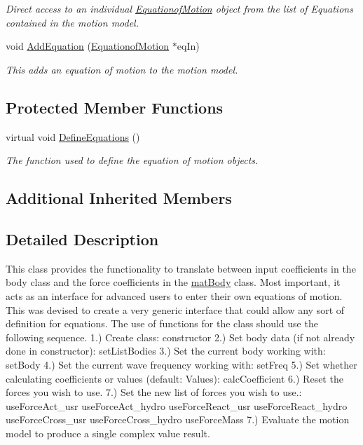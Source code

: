 \begin{DoxyCompactItemize}
\begin{DoxyCompactList}\small\item\em Direct access to an individual \hyperlink{classosea_1_1ofreq_1_1_equationof_motion}{Equationof\-Motion} object from the list of Equations contained in the motion model. \end{DoxyCompactList}\item 
void \hyperlink{classosea_1_1ofreq_1_1_motion_model_a73489d88c07b26109bbb9bdd0a576b30}{Add\-Equation} (\hyperlink{classosea_1_1ofreq_1_1_equationof_motion}{Equationof\-Motion} $\ast$eq\-In)
\begin{DoxyCompactList}\small\item\em This adds an equation of motion to the motion model. \end{DoxyCompactList}\end{DoxyCompactItemize}
\subsection*{Protected Member Functions}
\begin{DoxyCompactItemize}
\item 
virtual void \hyperlink{classosea_1_1ofreq_1_1_motion_model_a001b525e45be6f6c8f9088dacbb161c6}{Define\-Equations} ()
\begin{DoxyCompactList}\small\item\em The function used to define the equation of motion objects. \end{DoxyCompactList}\end{DoxyCompactItemize}
\subsection*{Additional Inherited Members}


\subsection{Detailed Description}
This class provides the functionality to translate between input coefficients in the body class and the force coefficients in the \hyperlink{classosea_1_1ofreq_1_1mat_body}{mat\-Body} class. Most important, it acts as an interface for advanced users to enter their own equations of motion. This was devised to create a very generic interface that could allow any sort of definition for equations. The use of functions for the class should use the following sequence. 1.) Create class\-: constructor 2.) Set body data (if not already done in constructor)\-: set\-List\-Bodies 3.) Set the current body working with\-: set\-Body 4.) Set the current wave frequency working with\-: set\-Freq 5.) Set whether calculating coefficients or values (default\-: Values)\-: calc\-Coefficient 6.) Reset the forces you wish to use. 7.) Set the new list of forces you wish to use.\-: use\-Force\-Act\-\_\-usr use\-Force\-Act\-\_\-hydro use\-Force\-React\-\_\-usr use\-Force\-React\-\_\-hydro use\-Force\-Cross\-\_\-usr use\-Force\-Cross\-\_\-hydro use\-Force\-Mass 7.) Evaluate the motion model to produce a single complex value result. 

